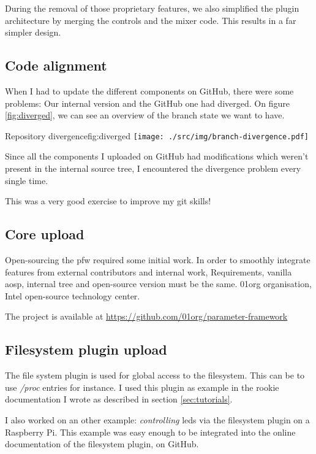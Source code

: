 During the removal of those proprietary features, we also simplified the plugin
architecture by merging the controls and the mixer code.
This results in a far simpler design.

\subsection{Code alignment}

When I had to update the different components on \gls{GitHub}, there were some problems:
Our internal version and the \gls{GitHub} one had diverged.
On figure \ref{fig:diverged}, we can see an overview of the branch state we want to have.

\begin{figureGraphics}{Repository divergence}{fig:diverged}
    \texttt{[image: ./src/img/branch-divergence.pdf]}
\end{figureGraphics}
Since all the components I uploaded on \gls{GitHub} had modifications which weren't present
in the internal source tree, I encountered the divergence problem every single time.

This was a very good exercise to improve my \gls{git} skills!

\subsection{Core upload}
Open-sourcing the \gls{pfw} required some initial work.
In order to smoothly integrate features from external contributors and internal work,
Requirements, vanilla \gls{aosp}, internal tree and open-source version must be the
same.
01org organisation, Intel open-source technology center.

The project is available at \url{https://github.com/01org/parameter-framework}

\subsection{Filesystem plugin upload}

The file system plugin is used for global access to the filesystem. This can be to
use \emph{/proc} entries for instance. I used this plugin as example in the rookie
documentation I wrote as described in section \ref{sec:tutorials}.

I also worked on an other example: \emph{controlling} leds via the filesystem
plugin on a Raspberry Pi.  This example was easy enough to be integrated into
the online documentation of the filesystem plugin, on \gls{GitHub}.

